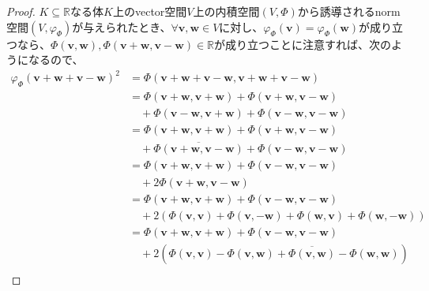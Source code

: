 \documentclass[dvipdfmx]{jsarticle}
\begin{document}
\begin{proof}
$K \subseteq \mathbb{R}$なる体$K$上のvector空間$V$上の内積空間$(V,\varPhi)$から誘導されるnorm空間$\left( V,\varphi_{\varPhi} \right)$が与えられたとき、$\forall\mathbf{v},\mathbf{w} \in V$に対し、$\varphi_{\varPhi}\left( \mathbf{v} \right) = \varphi_{\varPhi}\left( \mathbf{w} \right)$が成り立つなら、$\varPhi\left( \mathbf{v},\mathbf{w} \right),\varPhi\left( \mathbf{v} + \mathbf{w},\mathbf{v} - \mathbf{w} \right) \in \mathbb{R}$が成り立つことに注意すれば、次のようになるので、
\begin{align*}
{\varphi_{\varPhi}\left( \mathbf{v} + \mathbf{w} + \mathbf{v} - \mathbf{w} \right)}^{2} &= \varPhi\left( \mathbf{v} + \mathbf{w} + \mathbf{v} - \mathbf{w},\mathbf{v} + \mathbf{w} + \mathbf{v} - \mathbf{w} \right)\\
&= \varPhi\left( \mathbf{v} + \mathbf{w},\mathbf{v} + \mathbf{w} \right) + \varPhi\left( \mathbf{v} + \mathbf{w},\mathbf{v} - \mathbf{w} \right) \\
&\quad + \varPhi\left( \mathbf{v} - \mathbf{w},\mathbf{v} + \mathbf{w} \right) + \varPhi\left( \mathbf{v} - \mathbf{w},\mathbf{v} - \mathbf{w} \right)\\
&= \varPhi\left( \mathbf{v} + \mathbf{w},\mathbf{v} + \mathbf{w} \right) + \varPhi\left( \mathbf{v} + \mathbf{w},\mathbf{v} - \mathbf{w} \right) \\
&\quad + \overline{\varPhi\left( \mathbf{v} + \mathbf{w},\mathbf{v} - \mathbf{w} \right)} + \varPhi\left( \mathbf{v} - \mathbf{w},\mathbf{v} - \mathbf{w} \right)\\
&= \varPhi\left( \mathbf{v} + \mathbf{w},\mathbf{v} + \mathbf{w} \right) + \varPhi\left( \mathbf{v} - \mathbf{w},\mathbf{v} - \mathbf{w} \right) \\
&\quad + 2\varPhi\left( \mathbf{v} + \mathbf{w},\mathbf{v} - \mathbf{w} \right)\\
&= \varPhi\left( \mathbf{v} + \mathbf{w},\mathbf{v} + \mathbf{w} \right) + \varPhi\left( \mathbf{v} - \mathbf{w},\mathbf{v} - \mathbf{w} \right) \\
&\quad + 2\left( \varPhi\left( \mathbf{v},\mathbf{v} \right) + \varPhi\left( \mathbf{v}, - \mathbf{w} \right) + \varPhi\left( \mathbf{w},\mathbf{v} \right) + \varPhi\left( \mathbf{w}, - \mathbf{w} \right) \right)\\
&= \varPhi\left( \mathbf{v} + \mathbf{w},\mathbf{v} + \mathbf{w} \right) + \varPhi\left( \mathbf{v} - \mathbf{w},\mathbf{v} - \mathbf{w} \right) \\
&\quad + 2\left( \varPhi\left( \mathbf{v},\mathbf{v} \right) - \varPhi\left( \mathbf{v},\mathbf{w} \right) + \overline{\varPhi\left( \mathbf{v},\mathbf{w} \right)} - \varPhi\left( \mathbf{w},\mathbf{w} \right) \right)\\

\end{align*}
\end{proof}
\end{document}
